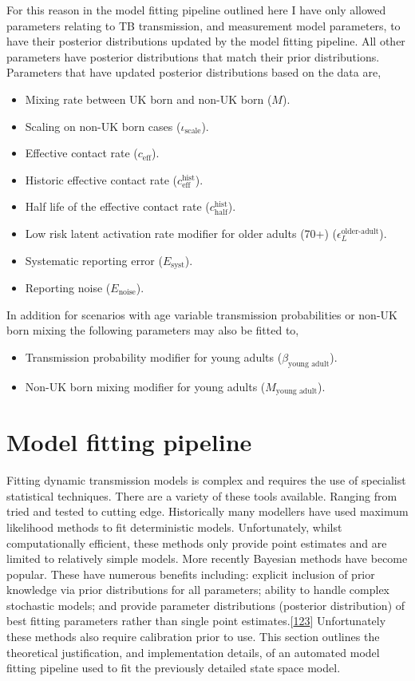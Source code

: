 \documentclass[11pt,twoside]{bristolthesis}
\providecommand{\tightlist}{%
  \setlength{\itemsep}{0pt}\setlength{\parskip}{0pt}}
\begin{document}
  For this reason in the model fitting pipeline outlined here I have only allowed parameters relating to TB transmission, and measurement model parameters, to have their posterior distributions updated by the model fitting pipeline. All other parameters have posterior distributions that match their prior distributions. Parameters that have updated posterior distributions based on the data are,
  \begin{itemize}
  \tightlist
  \item
    Mixing rate between UK born and non-UK born (\(M\)).
  \item
    Scaling on non-UK born cases (\(\iota_{\text{scale}}\)).
  \item
    Effective contact rate (\(c_{\text{eff}}\)).
  \item
    Historic effective contact rate (\(c^{\text{hist}}_{\text{eff}}\)).
  \item
    Half life of the effective contact rate (\(c^{\text{hist}}_{\text{half}}\)).
  \item
    Low risk latent activation rate modifier for older adults (70+) (\(\epsilon^{\text{older-adult}}_L\)).
  \item
    Systematic reporting error (\(E_{\text{syst}}\)).
  \item
    Reporting noise (\(E_{\text{noise}}\)).
  \end{itemize}
  In addition for scenarios with age variable transmission probabilities or non-UK born mixing the following parameters may also be fitted to,
  \begin{itemize}
  \tightlist
  \item
    Transmission probability modifier for young adults (\(\beta_{\text{young adult}}\)).
  \item
    Non-UK born mixing modifier for young adults (\(M_{\text{young adult}}\)).
  \end{itemize}
  \hypertarget{fitting-pipeline}{%
  \section{Model fitting pipeline}\label{fitting-pipeline}}
  
  Fitting dynamic transmission models is complex and requires the use of specialist statistical techniques. There are a variety of these tools available. Ranging from tried and tested to cutting edge. Historically many modellers have used maximum likelihood methods to fit deterministic models. Unfortunately, whilst computationally efficient, these methods only provide point estimates and are limited to relatively simple models. More recently Bayesian methods have become popular. These have numerous benefits including: explicit inclusion of prior knowledge via prior distributions for all parameters; ability to handle complex stochastic models; and provide parameter distributions (posterior distribution) of best fitting parameters rather than single point estimates.{[}\protect\hyperlink{ref-Murray2015}{123}{]} Unfortunately these methods also require calibration prior to use. This section outlines the theoretical justification, and implementation details, of an automated model fitting pipeline used to fit the previously detailed state space model.
  
\end{document}
